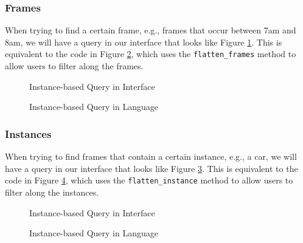 \subsubsection{Frames}
When trying to find a certain frame, e.g., frames that occur between 7am and 8am, we will have a query in our interface that looks like Figure \ref{fig:Frame1}. This is equivalent to the code in Figure \ref{fig:Frame2}, which uses the \texttt{flatten\_frames} method to allow users to filter along the frames.

\begin{figure}[H]
    \caption{Instance-based Query in Interface}
    \label{fig:Frame1}
\end{figure}

\begin{figure}[H]
    \caption{Instance-based Query in Language}
    \label{fig:Frame2}
\end{figure}

\subsubsection{Instances}
When trying to find frames that contain a certain instance, e.g., a car, we will have a query in our interface that looks like Figure \ref{fig:Instance1}. This is equivalent to the code in Figure \ref{fig:Instance2}, which uses the \texttt{flatten\_instance} method to allow users to filter along the instances.

\begin{figure}[H]
    \caption{Instance-based Query in Interface}
    \label{fig:Instance1}
\end{figure}

\begin{figure}[H]
    \caption{Instance-based Query in Language}
    \label{fig:Instance2}
\end{figure}

